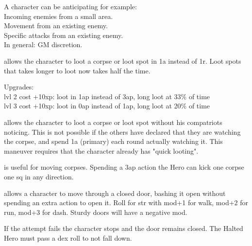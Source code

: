 A character can be anticipating for example: \\
Incoming enemies from a small area. \\
Movement from an existing enemy. \\
Specific attacks from an existing enemy. \\
In general: GM discretion.


 allows the character to loot a corpse or loot spot in 1a instead of 1r. Loot spots that takes longer to loot now takes half the time.

Upgrades:\\
lvl 2 cost +10xp: loot in 1ap instead of 3ap, long loot at 33\% of time\\
lvl 3 cost +10xp: loot in 0ap instead of 1ap, long loot at 20\% of time


 allows the character to loot a corpse or loot spot without his compatriots noticing. This is not possible if the others have declared that they are watching the corpse, and spend 1a (primary) each round actually watching it. This maneuver requires that the character already has "quick looting".


 is useful for moving corpses. Spending a 3ap action the Hero can kick one corpse one sq in any direction.


 allows a character to move through a closed door, bashing it open without spending an extra action to open it. Roll for str with mod+1 for walk, mod+2 for run, mod+3 for dash. Sturdy doors will have a negative mod.

If the attempt fails the character stops and the door remains closed. The Halted Hero must pass a dex roll to not fall down.





